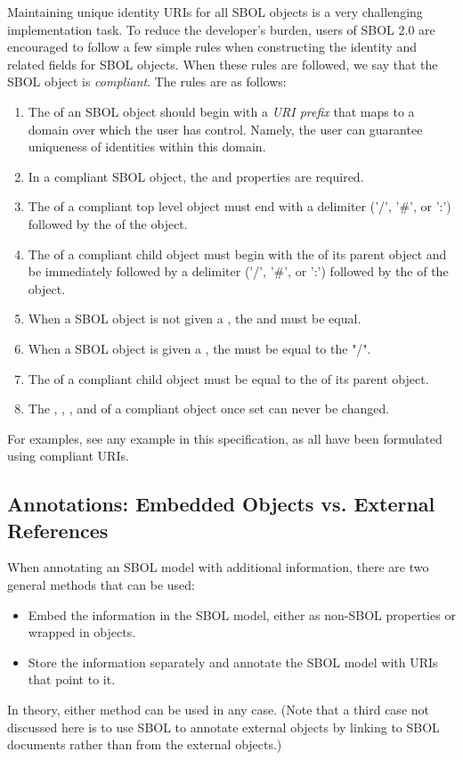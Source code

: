 Maintaining unique identity URIs for all SBOL objects is a very challenging implementation task.  To reduce the developer's burden, users of SBOL 2.0 are encouraged to follow a few simple rules when constructing the identity and related fields for SBOL objects.  When these rules are followed, we say that the SBOL object is \emph{compliant}.  The rules are as follows:
\begin{enumerate}
\item The  of an SBOL object should begin with a \emph{URI prefix} that maps to a domain over which the user has control.  Namely, the user can guarantee uniqueness of identities within this domain.
\item In a compliant SBOL object, the  and  properties are required.
\item The  of a compliant top level object must end with a delimiter ('/', '\#', or ':') followed by the  of the object. 
\item The  of a compliant child object must begin with the  of its parent object and be immediately followed by a delimiter ('/', '\#', or ':') followed by the  of the object.
\item When a SBOL object is not given a , the  and  must be equal.
\item When a SBOL object is given a , the  must be equal to the "/".
\item The  of a compliant child object must be equal to the  of its parent object.
\item The , , , and  of a compliant object once set can never be changed.
\end{enumerate}

For examples, see any example in this specification, as all have been
formulated using compliant URIs.

\subsection{Annotations: Embedded Objects vs. External References}

When annotating an SBOL model with additional information, there are
two general methods that can be used:
\begin{itemize}
\item Embed the information in the SBOL model, either as non-SBOL
  properties or wrapped in  objects.
\item Store the information separately and annotate the SBOL model
  with URIs that point to it.
\end{itemize}
In theory, either method can be used in any case. (Note that a third case not
discussed here is to use SBOL to annotate external objects by linking
to SBOL documents rather than from the external objects.)

